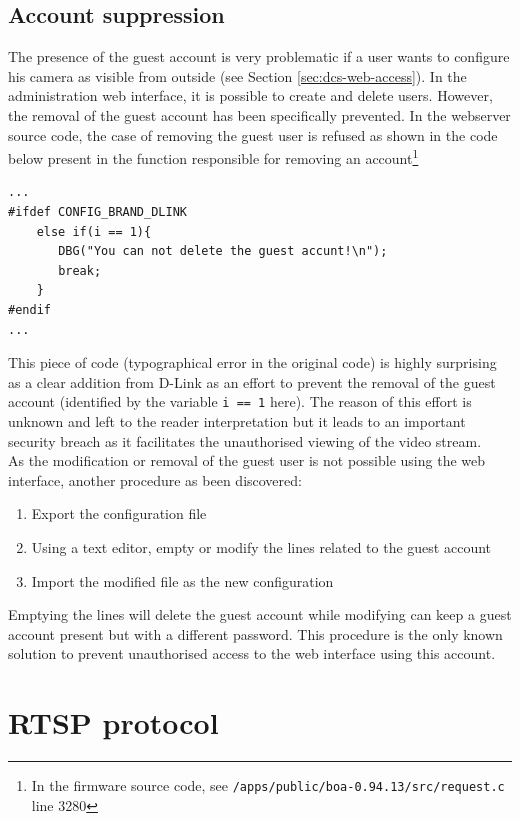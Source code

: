 \subsection{Account suppression}
\label{sec:dcs-guest-suppression}

The presence of the guest account is very problematic if a user wants to configure his camera as visible from outside (see Section \ref{sec:dcs-web-access}).
In the administration web interface, it is possible to create and delete users.
However, the removal of the guest account has been specifically prevented.
In the webserver source code, the case of removing the guest user is refused as shown in the code below present in the function responsible for removing an account\footnote{In the firmware source code, see \texttt{/apps/public/boa-0.94.13/src/request.c} line 3280}

{\scriptsize
\begin{verbatim}
...
#ifdef CONFIG_BRAND_DLINK
    else if(i == 1){
       DBG("You can not delete the guest accunt!\n");
       break;
    }
#endif
...
\end{verbatim}
}

This piece of code (typographical error in the original code) is highly surprising as a clear addition from D-Link as an effort to prevent the removal of the guest account (identified by the variable \texttt{i == 1} here).
The reason of this effort is unknown and left to the reader interpretation but it leads to an important security breach as it facilitates the unauthorised viewing of the video stream.\\

As the modification or removal of the guest user is not possible using the web interface, another procedure as been discovered:

\begin{enumerate}
\item Export the configuration file
\item Using a text editor, empty or modify the lines related to the guest account
\item Import the modified file as the new configuration
\end{enumerate}

Emptying the lines will delete the guest account while modifying can keep a guest account present but with a different password.
This procedure is the only known solution to prevent unauthorised access to the web interface using this account.

\section{RTSP protocol}
\label{sec:dcs-rtsp}

